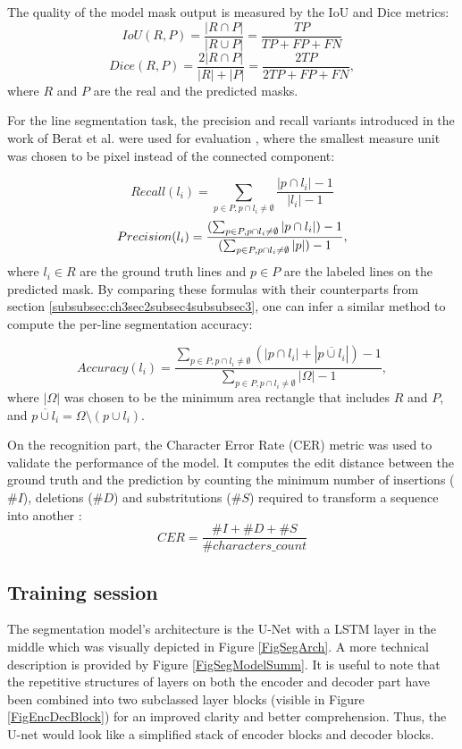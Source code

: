 The quality of the model mask output is measured by the IoU \cite{iou} and Dice \cite{dice} metrics:
$$ IoU(R,P) = \frac{|R \cap P|}{|R \cup P|} = \frac{TP}{TP+FP+FN} $$
$$ Dice(R,P) = \frac{2|R \cap P|}{|R| + |P|} = \frac{2 TP}{2TP+FP+FN},  $$
where $R$ and $P$ are the real and the predicted masks.

For the line segmentation task, the precision and recall variants introduced in the work of Berat et al. were used for evaluation \cite{segmChallenging}, where the smallest measure unit was chosen to be pixel instead of the connected component:

$$Recall(l_i) = \sum_{p \in P, p\cap l_i \neq \emptyset} \frac{|p \cap l_i|-1}{|l_i|-1}$$
$$Precision(l_i) = \frac{ (\sum_{p\in P, \space p\cap l_i \neq \emptyset} |p\cap l_i|)-1}{
(\sum_{p\in P, \space p\cap l_i \neq \emptyset} |p|)-1},$$
where $l_i \in R$ are the ground truth lines and $p\in P$ are the labeled lines on the predicted mask.
By comparing these formulas with their counterparts from section \ref{subsubsec:ch3sec2subsec4subsubsec3}, one can infer a similar method to compute the per-line segmentation accuracy:

$$Accuracy(l_i) = \frac{\sum_{p \in P, p\cap l_i \neq \emptyset}(|p \cap l_i| + |\overline{p\cup l_i}|)-1}{\sum_{p \in P, p\cap l_i \neq \emptyset} |\Omega|-1},$$
where $|\Omega|$ was chosen to be the minimum area rectangle that includes $R$ and $P$, and $\overline{p\cup l_i}=\Omega \setminus (p \cup l_i)$.

On the recognition part, the Character Error Rate (CER) metric was used to va\-lidate the performance of the model. It computes the edit distance between the ground truth and the prediction by counting the 
minimum number of insertions ($\#I$), deletions ($\#D$) and substritutions ($\#S$) required to transform a sequence into another \cite{cer}:
$$CER = \frac{\#I+\#D+\#S}{\#characters\_count}$$

\subsection{Training session}


The segmentation model's architecture is the U-Net with a LSTM layer in the middle which was visually depicted in Figure \ref{FigSegArch}. A more technical description is provided by Figure \ref{FigSegModelSumm}. It is useful to note that the repetitive structures of layers on both the encoder and decoder part have been combined into two subclassed layer blocks (visible in Figure \ref{FigEncDecBlock}) for an improved clarity and better comprehension. Thus, the U-net would look like a simplified stack of encoder blocks and decoder blocks.


